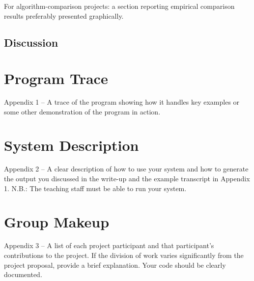 \documentclass[11pt]{article}
\begin{document}
 For algorithm-comparison projects: a section reporting empirical comparison results preferably presented graphically.


\subsection{Discussion}


\appendix

\section{Program Trace}

Appendix 1 – A trace of the program showing how it handles key examples or some other demonstration of the program in action.

\section{System Description}

 Appendix 2 – A clear description of how to use your system and how to generate the output you discussed in the write-up and the example transcript in Appendix 1. N.B.: The teaching staff must be able to run your system.

\section{Group Makeup}

 Appendix 3 – A list of each project participant and that
participant’s contributions to the project. If the division of work
varies significantly from the project proposal, provide a brief
explanation.  Your code should be clearly documented. 



 

\end{document}

